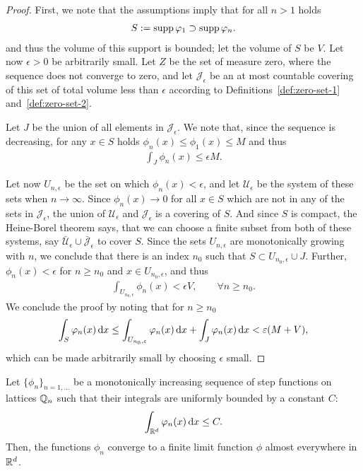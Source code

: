 \begin{proof}
  First, we note that the assumptions imply that for all $n>1$ holds
  \begin{gather*}
    S:= \operatorname{supp} \varphi_1 \supset \operatorname{supp} \varphi_n.
  \end{gather*}
  and thus the volume of this support is bounded; let the volume of
  $S$ be $V$. Let now $\epsilon>0$ be arbitrarily small. Let $Z$ be
  the set of measure zero, where the sequence does not converge to
  zero, and let $\mathcal J_\epsilon$ be an at most countable covering
  of this set of total volume less than $\epsilon$ according to
  Definitions~\ref{def:zero-set-1} and~\ref{def:zero-set-2}.

  Let $J$ be the union of all elements in $\mathcal J_\epsilon$. We
  note that, since the sequence is decreasing, for any $x\in S$ holds
  $\phi_n(x) \le \phi_1(x) \le M$ and thus
  \begin{gather*}
    \int_J \phi_n(x) \le \epsilon M.
  \end{gather*}
  
  Let now $U_{n,\epsilon}$ be the set on which $\phi_n(x)<\epsilon$,
  and let $\mathcal U_\epsilon$ be the system of these sets when
  $n\to\infty$. Since $\phi_n(x)\to 0$ for all $x\in S$ which are not
  in any of the sets in $\mathcal J_\epsilon$, the union of $\mathcal
  U_\epsilon$ and $\mathcal J_\epsilon$ is a covering of $S$. And
  since $S$ is compact, the Heine-Borel theorem says, that we can
  choose a finite subset from both of these systems, say
  $\breve{\mathcal U_\epsilon} \cup \breve{\mathcal J_\epsilon}$ to
  cover $S$. Since the sets $U_{n,\epsilon}$ are monotonically growing
  with $n$, we conclude that there is an index $n_0$ such that
  $S\subset U_{n_0,\epsilon} \cup J$.  Further, $\phi_n(x) < \epsilon$
  for $n\ge n_0$ and $x\in U_{n_0,\epsilon}$, and thus
  \begin{gather*}
    \int_{U_{n_0,\epsilon}} \phi_n(x) < \epsilon V,
    \qquad \forall n\ge n_0.
  \end{gather*}
  We conclude the proof by noting that for $n\ge n_0$
  \begin{gather*}
    \int_{S} \varphi_n(x)\,\mathrm{d} x
    \le \int_{U_{n_0,\varepsilon}} \varphi_n(x)\,\mathrm{d} x + \int_{J} \varphi_n(x)\,\mathrm{d} x
    < \varepsilon(M+V),
  \end{gather*}
  which can be made arbitrarily small by choosing $\epsilon$ small.
\end{proof}

\begin{lemma}
  \label{lemma:integral:2}
  Let $\{\phi_n\}_{n=1,\dots}$ be a monotonically increasing sequence
  of step functions on lattices $\mathbb Q_n$ such that their integrals are
  uniformly bounded by a constant $C$:
  \begin{gather}
    \label{eq:integral:1}
    \int_{\mathbb R^d} \varphi_n(x) \,\mathrm{d} x \le C.
  \end{gather}
  Then, the functions $\phi_n$ converge to a finite limit function
  $\phi$ almost everywhere in $\mathbb R^d$.
\end{lemma}

